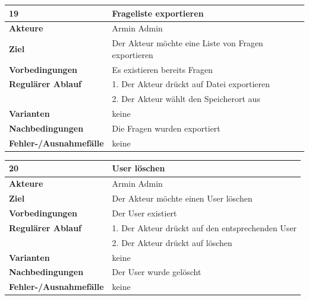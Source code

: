 \documentclass[fontsize=12pt,paper=a4,twoside]{scrartcl}
\begin{document}
\begin{table}
	[H] \label{19} 
	\begin{tabular}
		{|l|p{10cm}|} \hline \textbf{19} & \textbf{Frageliste exportieren} \\
		\hline \textbf{Akteure} & Armin Admin\\
		\hline \textbf{Ziel} & Der Akteur möchte eine Liste von Fragen exportieren\\
		\hline \textbf{Vorbedingungen} & Es existieren bereits Fragen\\
		\hline \textbf{Regulärer Ablauf} & 1. Der Akteur drückt auf Datei exportieren\\
		&2. Der Akteur wählt den Speicherort aus\\
		\hline \textbf{Varianten} & keine \\
		\hline \textbf{Nachbedingungen} & Die Fragen wurden exportiert\\
		\hline \textbf{Fehler-/Ausnahmefälle} & keine \\
		\hline 
	\end{tabular}
\end{table}

\begin{table}
	[H] \label{20} 
	\begin{tabular}
		{|l|p{10cm}|} \hline \textbf{20} & \textbf{User löschen} \\
		\hline \textbf{Akteure} & Armin Admin\\
		\hline \textbf{Ziel} & Der Akteur möchte einen User löschen\\
		\hline \textbf{Vorbedingungen} & Der User existiert\\
		\hline \textbf{Regulärer Ablauf} & 1. Der Akteur drückt auf den entsprechenden User\\
		&2. Der Akteur drückt auf löschen\\
		\hline \textbf{Varianten} & keine \\
		\hline \textbf{Nachbedingungen} & Der User wurde gelöscht\\
		\hline \textbf{Fehler-/Ausnahmefälle} & keine \\
		\hline 
	\end{tabular}
\end{table}
\end{document}
